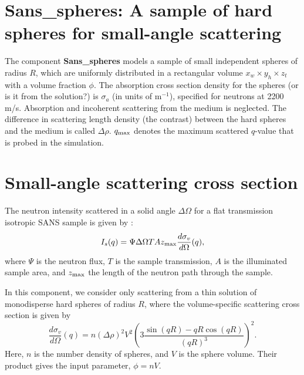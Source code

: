 \section{Sans\_spheres: A sample of hard spheres for small-angle scattering}
\label{sans}

The component {\bf Sans\_spheres} models a sample of small independent
spheres of radius $R$, which are uniformly distributed
in a rectangular volume $x_w \times y_h \times z_t$ with a volume
fraction $\phi$. The absorption cross section density for the spheres 
(or is it from the solution?)
is $\sigma_a$ (in units of m$^{-1}$), specified
for neutrons at 2200 m/s. Absorption and incoherent scattering from the medium
is neglected.
The difference in scattering length density
(the contrast) between the hard spheres and the medium is called $\Delta \rho$.
$q_{\rm max}$ denotes the maximum scattered $q$-value that is probed 
in the simulation.

\section{Small-angle scattering cross section}
The neutron intensity scattered in a solid angle $\Delta \Omega$
for a flat transmission isotropic SANS sample is given by \cite{ILLblue}:
\begin{equation}
I_s(q) = \Psi \Delta\Omega T A z_{\rm max} \frac{d\sigma_v}{d\Omega}(q) ,
\end{equation} 
where $\Psi$ is the neutron flux, $T$ is the sample transmission,
$A$ is the illuminated sample area, and $z_{\rm max}$ the length of
the neutron path through the sample.

In this component, we consider only scattering from a thin solution
of monodisperse hard spheres of radius $R$, where the volume-specific 
scattering cross section is given by \cite{ILLblue}
\begin{equation}
\frac{d\sigma_v}{d\Omega}(q) = 
  n (\Delta\rho)^2 V^2 \left( 3\frac{\sin(qR)-qR\cos(qR)}{(qR)^3} \right)^2 . 
\end{equation}
Here, $n$ is the number density of spheres, and $V$ is the
sphere volume. Their product gives the input parameter, $\phi=nV$.

